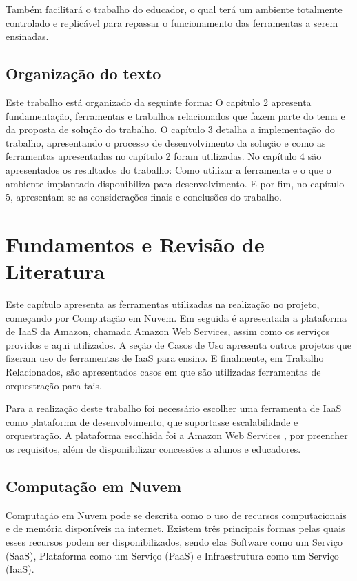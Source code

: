 \documentclass[tg]{mdtufsm}
\begin{document}
Também facilitará o trabalho do educador, o qual terá um ambiente totalmente controlado e replicável para repassar o funcionamento das ferramentas a serem ensinadas.

\section{Organização do texto}

Este trabalho está organizado da seguinte forma: O capítulo 2 apresenta fundamentação, ferramentas e trabalhos relacionados que fazem parte do tema e da proposta de solução do trabalho.
O capítulo 3 detalha a implementação do trabalho, apresentando o processo de desenvolvimento da solução e como as ferramentas apresentadas no capítulo 2 foram utilizadas.
No capítulo 4 são apresentados os resultados do trabalho: Como utilizar a ferramenta e o que o ambiente implantado disponibiliza para desenvolvimento. E por fim, no capítulo 5, apresentam-se as considerações finais e conclusões do trabalho.

\chapter{Fundamentos e Revisão de Literatura}

Este capítulo apresenta as ferramentas utilizadas na realização no projeto, começando por Computação em Nuvem. Em seguida é apresentada a plataforma de IaaS da Amazon, chamada Amazon Web Services, assim como os serviços providos e aqui utilizados. A seção de Casos de Uso apresenta outros projetos que fizeram uso de ferramentas de IaaS para ensino. E finalmente, em Trabalho Relacionados, são apresentados casos em que são utilizadas ferramentas de orquestração para tais.

Para a realização deste trabalho foi necessário escolher uma ferramenta de IaaS como plataforma de desenvolvimento, que suportasse escalabilidade e orquestração. A plataforma escolhida foi a Amazon Web Services \cite{aws}, por preencher os requisitos, além de disponibilizar concessões a alunos e educadores.

\section{Computação em Nuvem}


Computação em Nuvem pode se descrita como o uso de recursos computacionais e de memória disponíveis na internet. Existem três principais formas pelas quais esses recursos podem ser disponibilizados, sendo elas Software como um Serviço (SaaS), Plataforma como um Serviço (PaaS) e Infraestrutura como um Serviço (IaaS).
\end{document}
